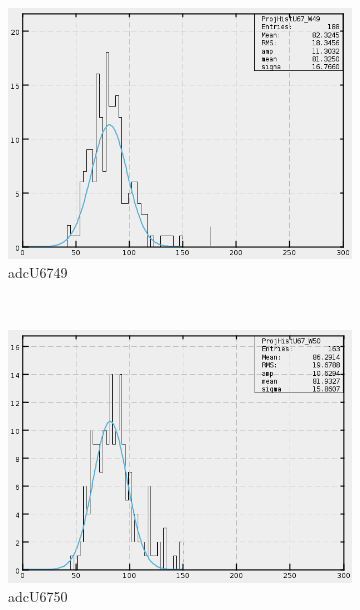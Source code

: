 \begin{figure}[h]
\begin{subfigure}[h]{0.3\textwidth}
        \includegraphics[width=\textwidth, keepaspectratio = true]{adcU67_49}
        \caption{adcU6749}
        \label{fig:adcU67_49}
    \end{subfigure}
    \\
    \begin{subfigure}[h]{0.3\textwidth}
        \centering
        \includegraphics[width=\textwidth, keepaspectratio = true]{adcU67_50}
        \caption{adcU6750}
        \label{fig:adcU67_50}
    \end{subfigure}
    ~
    \begin{subfigure}[h]{0.3\textwidth}
        \centering

\end{subfigure}
\end{figure}

